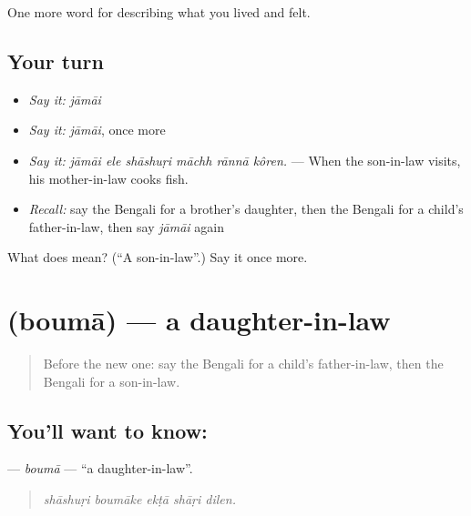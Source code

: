 \begin{grammarlens}[title={What you've built}]
One more word for describing what you lived and felt.
\end{grammarlens}

\subsection*{Your turn}
\begin{itemize}
\raggedright
  \item \emph{Say it:} \emph{jāmāi}
  \item \emph{Say it:} \emph{jāmāi}, once more
  \item \emph{Say it:} \emph{jāmāi ele shāshuṛi māchh rānnā kôren.} — When the son-in-law visits, his mother-in-law cooks fish.
  \item \emph{Recall:} say the Bengali for a brother's daughter, then the Bengali for a child's father-in-law, then say \emph{jāmāi} again
\end{itemize}

\begin{tcolorbox}[breakable,colback=teal!4,colframe=teal!35!black,title={Before you move on}]
What does  mean? (\textquotedblleft{}A son-in-law\textquotedblright{}.) Say it once more.
\end{tcolorbox}
\section[\texorpdfstring{\bn{বউমা} (boumā)}{বউমা (boumā)}]{ (boumā) — a daughter-in-law}

\label{lesson:BN-C483-bouma}



\begin{quote}
Before the new one: say the Bengali for a child's father-in-law, then the Bengali for a son-in-law.
\end{quote}

\subsection*{You'll want to know: }
\textbf{} — \emph{boumā} — \textquotedblleft{}a daughter-in-law\textquotedblright{}.

\begin{quote}
    
\end{quote}

\begin{quote}
\emph{shāshuṛi boumāke ekṭā shāṛi dilen.}
\end{quote}


